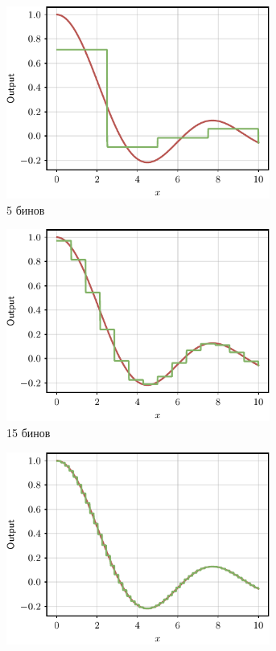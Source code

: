 \begin{figure}[t]
    \centering
    \begin{subfigure}[b]{0.32\textwidth}
    \includegraphics[width=0.95\textwidth]{images/sin_approximation_5.pdf}
    \caption{5 бинов}
    \end{subfigure}
    \hfill
    \begin{subfigure}[b]{0.32\textwidth}
    \includegraphics[width=0.95\textwidth]{images/sin_approximation_15.pdf}
    \caption{15 бинов}
    \end{subfigure}
    \hfill
    \begin{subfigure}[b]{0.32\textwidth}
    \includegraphics[width=0.95\textwidth]{images/sin_approximation_50.pdf}

\end{subfigure}
\end{figure}
